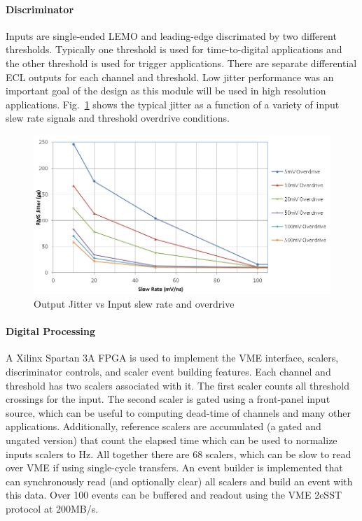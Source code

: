 \paragraph{Discriminator}
Inputs are single-ended LEMO and leading-edge discrimated by two different thresholds. Typically one threshold is used for time-to-digital applications and the other threshold is used for trigger applications. There are separate differential ECL outputs for each channel and threshold. Low jitter performance was an important goal of the design as this module will be used in high resolution applications. Fig.~\ref{fig:dsc2_jitter} shows the typical jitter as a function of a variety of input slew rate signals and threshold overdrive conditions.

\begin{figure}[hbt]
	\centering
	\includegraphics[width=1.0\columnwidth,keepaspectratio]{img/dsc2_jitter.png}
	\caption{Output Jitter vs Input slew rate and overdrive}
	\label{fig:dsc2_jitter}
\end{figure}

\paragraph{Digital Processing}
A Xilinx Spartan 3A FPGA is used to implement the VME interface, scalers, discriminator controls, and scaler event building features. Each channel and threshold has two scalers associated with it. The first scaler counts all threshold crossings for the input. The second scaler is gated using a front-panel input source, which can be useful to computing dead-time of channels and many other applications. Additionally, reference scalers are accumulated (a gated and ungated version) that count the elapsed time which can be used to normalize inputs scalers to Hz. All together there are 68 scalers, which can be slow to read over VME if using single-cycle transfers. An event builder is implemented that can synchronously read (and optionally clear) all scalers and build an event with this data. Over 100 events can be buffered and readout using the VME 2eSST protocol at 200MB/s.


